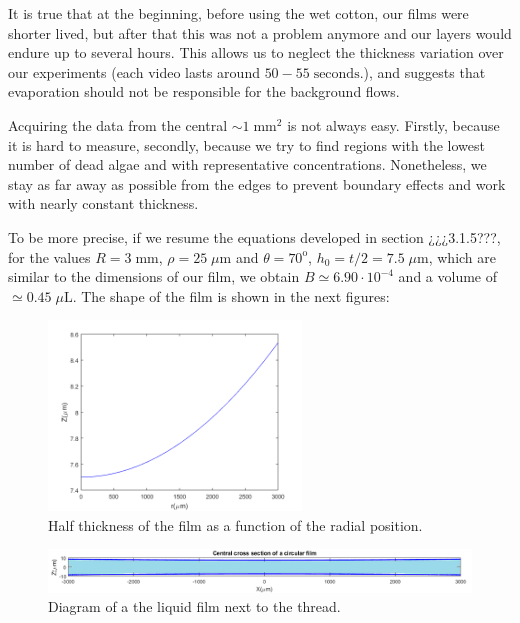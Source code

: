 It is true that at the beginning, before using the wet cotton, our films were shorter lived, but after that this was not a problem anymore and our layers would endure up to several hours. This allows us to neglect the thickness variation over our experiments (each video lasts around $50-55 \; \textrm{seconds}$.), and suggests that evaporation should not be responsible for the background flows.

Acquiring the data from the central $ \sim 1 \; \textrm{mm}^2 $ is not always easy. Firstly, because it is hard to measure, secondly, because we try to find regions with the lowest number of dead algae and with representative concentrations. Nonetheless, we stay as far away as possible from the edges to prevent boundary effects and work with nearly constant thickness.

To be more precise, if we resume the equations developed in section ¿¿¿3.1.5???, for the values $R = 3 \; \textrm{mm}$, $\rho = 25 \; \mu \textrm{m}$ and $\theta = 70^\textrm{o}$, $h_0 = t/2 = 7.5 \; \mu \textrm{m}$, which are similar to the dimensions of our film, we obtain $B \simeq 6.90 \cdot 10^{-4}$ and a volume of $ \simeq 0.45 \; \mu \textrm{L}$. The shape of the film is shown in the next figures:

\begin{figure}[H]
	\centering
	\includegraphics[width=0.6\textwidth]{archivos/CircFilmFunction.png}
	\caption{Half thickness of the film as a function of the radial position.}
	\label{CircFilmFunction}
\end{figure}

\begin{figure}[H]
	\centering
	\includegraphics[width=\textwidth]{archivos/CircFilmSection.png}
	\caption{Diagram of a the liquid film next to the thread.}
	\label{CircFilmSection}
\end{figure}

